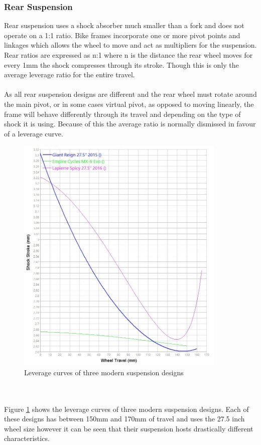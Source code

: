 \documentclass[a4paper, 12pt, hidelinks]{article}
\begin{document}
	\subsubsection{Rear Suspension}
		Rear suspension uses a shock absorber much smaller than a \gls{fork} and does not operate on a 1:1 ratio. Bike frames incorporate one or more pivot points and linkages which allows the wheel to move and act as multipliers for the suspension. Rear ratios are expressed as n:1 where n is the distance the rear wheel moves for every 1mm the shock compresses through its stroke. Though this is only the average leverage ratio for the entire travel.
		\\\\
		As all rear suspension designs are different and the rear wheel must rotate around the main pivot, or in some cases virtual pivot, as opposed to moving linearly, the frame will behave differently through its travel and depending on the type of \gls{shock} it is using. Because of this the average ratio is normally dismissed in favour of a leverage curve.
		\begin{figure}[h!]
			\centering
			\includegraphics[width=10cm]{../images/3_bike_lev_ratio.jpg}
			\caption{Leverage curves of three modern suspension designs}
			\label{fig:3_bike_lev_ratio}
		\end{figure}
		\\\\
		Figure \ref{fig:3_bike_lev_ratio} shows the leverage curves of three modern suspension designs. Each of these designs has between 150mm and 170mm of travel and uses the 27.5 inch wheel size however it can be seen that their suspension hosts drastically different characteristics. 
\end{document}
